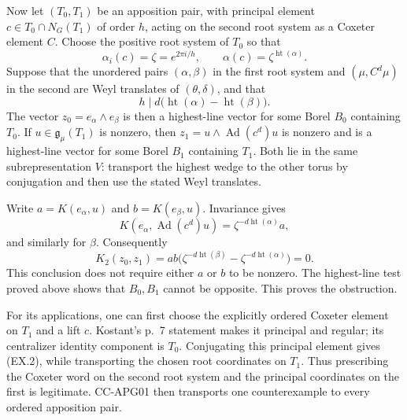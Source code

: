 \documentclass[11pt,a4paper]{article}
\theoremstyle{definition}\newtheorem{definition}[theorem]{Definition}
\theoremstyle{remark}\newtheorem{remark}[theorem]{Remark}
\begin{document}
Now let $(T_0,T_1)$ be an apposition pair, with principal element
$c\in T_0\cap N_G(T_1)$ of order $h$, acting on the second root
system as a Coxeter element $C$.  Choose the positive root system
of $T_0$ so that
\[
 \alpha_i(c)=\zeta=e^{2\pi i/h},\qquad
 \alpha(c)=\zeta^{\operatorname{ht}(\alpha)}.
 \tag{EX.2}
\]
Suppose that the unordered pairs $(\alpha,\beta)$ in the first
root system and $(\mu,C^d\mu)$ in the second are Weyl translates
of $(\theta,\delta)$, and that
\[
             h\mid d\bigl(\operatorname{ht}(\alpha)
                            -\operatorname{ht}(\beta)\bigr).
 \tag{EX.3}
\]
The vector $z_0=e_\alpha\wedge e_\beta$ is then a highest-line
vector for some Borel $B_0$ containing $T_0$.  If
$u\in\mathfrak g_\mu(T_1)$ is nonzero, then
$z_1=u\wedge\operatorname{Ad}(c^d)u$ is nonzero and is a
highest-line vector for some Borel $B_1$ containing $T_1$.
Both lie in the same subrepresentation $V$: transport the highest
wedge to the other torus by conjugation and then use the stated
Weyl translates.

Write $a=K(e_\alpha,u)$ and $b=K(e_\beta,u)$.  Invariance gives
\[
 K(e_\alpha,\operatorname{Ad}(c^d)u)
       =\zeta^{-d\operatorname{ht}(\alpha)}a,
\]
and similarly for $\beta$.  Consequently
\[
 K_2(z_0,z_1)=ab\bigl(
       \zeta^{-d\operatorname{ht}(\beta)}
       -\zeta^{-d\operatorname{ht}(\alpha)}\bigr)=0.
 \tag{EX.4}
\]
This conclusion does not require either $a$ or $b$ to be nonzero.
The highest-line test proved above shows that $B_0,B_1$ cannot be
opposite.  This proves the obstruction.

For its applications, one can first choose the explicitly ordered
Coxeter element on $T_1$ and a lift $c$.  Kostant's p.~7 statement
makes it principal and regular; its centralizer identity component
is $T_0$.  Conjugating this principal element gives (EX.2), while
transporting the chosen root coordinates on $T_1$.  Thus prescribing
the Coxeter word on the second root system and the principal
coordinates on the first is legitimate.  CC-APG01 then transports
one counterexample to every ordered apposition pair.
\end{document}
